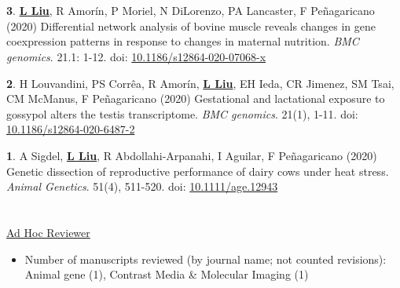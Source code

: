 \documentclass[margin,line,10pt]{res}
\newenvironment{list1}{
  \begin{list}{\ding{113}}{%
      \setlength{\itemsep}{0in}
      \setlength{\parsep}{0in} \setlength{\parskip}{0in}
      \setlength{\topsep}{0in} \setlength{\partopsep}{0in} 
      \setlength{\leftmargin}{0.17in}}}{\end{list}}
\begin{document}
\begin{resume}
\section{}
\begin{list1}

\item [{\bf 3}.] \textbf{\underline{L Liu}}, R Amorín, P Moriel, N DiLorenzo, PA Lancaster, F Peñagaricano (2020) Differential network analysis of bovine muscle reveals changes in gene coexpression patterns in response to changes in maternal nutrition. \emph{BMC genomics}. 21.1: 1-12. doi: \textcolor{blue}{\href{https://doi.org/10.1186/s12864-020-07068-x}{10.1186/s12864-020-07068-x}}
    \vspace{0.2cm}
    
\item [{\bf 2}.] H Louvandini, PS Corrêa, R Amorín, \textbf{\underline{L Liu}}, EH Ieda, CR Jimenez, SM Tsai, CM McManus, F Peñagaricano (2020) Gestational and lactational exposure to gossypol alters the testis transcriptome. \emph{BMC genomics}. 21(1), 1-11. doi: \textcolor{blue}{\href{https://doi.org/10.1186/s12864-020-6487-2}{10.1186/s12864-020-6487-2}}
    \vspace{0.2cm}
    
\item [{\bf 1}.] A Sigdel, \textbf{\underline{L Liu}}, R Abdollahi‐Arpanahi, I Aguilar, F Peñagaricano (2020) Genetic dissection of reproductive performance of dairy cows under heat stress. \emph{Animal Genetics}. 51(4), 511-520. doi: \textcolor{blue}{\href{https://onlinelibrary.wiley.com/doi/full/10.1111/age.12943}{10.1111/age.12943}}
    \vspace{0.2cm}
\end{list1}


\section{ }
\underline{Ad Hoc Reviewer}
\begin{itemize}
    \vspace{.2cm}
	\item  Number of manuscripts reviewed (by journal name; not counted revisions): \\ 
			Animal gene (1), Contrast Media \& Molecular Imaging (1)
\end{itemize}



\end{resume}
\end{document}
